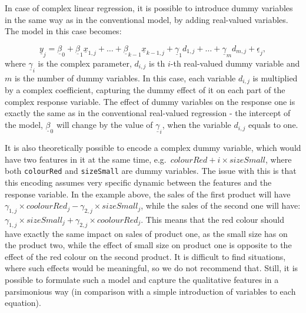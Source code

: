 \documentclass[
]{book}
\begin{document}
In case of complex linear regression, it is possible to introduce dummy variables in the same way as in the conventional model, by adding real-valued variables. The model in this case becomes:

\begin{equation}
    \underline{y}_j = \underline{\beta}_0 + \underline{\beta}_1 \underline{x}_{1,j} + \dots + \underline{\beta}_{k-1} \underline{x}_{k-1,j} + \underline{\gamma}_1 d_{1,j} + \dots + \underline{\gamma}_m d_{m,j} + \underline{\epsilon}_j,
    \label{eq:MultipleCLRComplexDummy}
\end{equation}
where \(\underline{\gamma}_i\) is the complex parameter, \(d_{i,j}\) is th \(i\)-th real-valued dummy variable and \(m\) is the number of dummy variables. In this case, each variable \(d_{i,j}\) is multiplied by a complex coefficient, capturing the dummy effect of it on each part of the complex response variable. The effect of dummy variables on the response one is exactly the same as in the conventional real-valued regression - the intercept of the model, \(\underline{\beta}_0\) will change by the value of \(\underline{\gamma}_i\), when the variable \(d_{i,j}\) equals to one.

It is also theoretically possible to encode a complex dummy variable, which would have two features in it at the same time, e.g.~\(colourRed + i \times sizeSmall\), where both \texttt{colourRed} and \texttt{sizeSmall} are dummy variables. The issue with this is that this encoding assumes very specific dynamic between the features and the response variable. In the example above, the sales of the first product will have \(\gamma_{1,j} \times coolourRed_j - \gamma_{2,j} \times sizeSmall_j\), while the sales of the second one will have: \(\gamma_{1,j} \times sizeSmall_j + \gamma_{2,j} \times coolourRed_j\). This means that the red colour should have exactly the same impact on sales of product one, as the small size has on the product two, while the effect of small size on product one is opposite to the effect of the red colour on the second product. It is difficult to find situations, where such effects would be meaningful, so we do not recommend that. Still, it is possible to formulate such a model and capture the qualitative features in a parsimonious way (in comparison with a simple introduction of variables to each equation).
\end{document}
